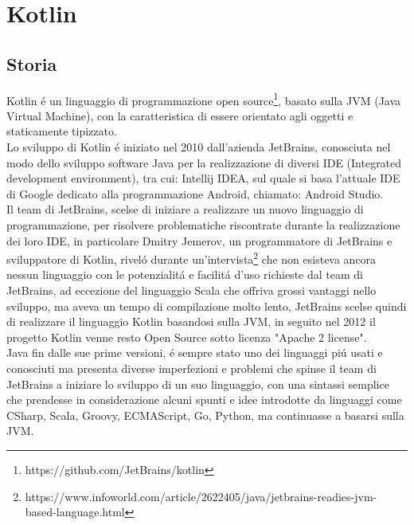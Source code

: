 \chapter{Kotlin}                %
\lhead[\fancyplain{}{\bfseries\thepage}]{\fancyplain{}{\bfseries\rightmark}}
\section{Storia}                 %

Kotlin \'e un linguaggio di programmazione open source\footnote{https://github.com/JetBrains/kotlin}, basato sulla JVM (Java Virtual Machine), con la caratteristica di essere orientato agli oggetti e staticamente tipizzato. \\
Lo sviluppo di Kotlin \'e iniziato nel 2010 dall'azienda JetBrains, conosciuta nel modo dello sviluppo software Java per la realizzazione di diversi IDE (Integrated development environment), tra cui: Intellij IDEA, sul quale si basa l'attuale IDE di Google dedicato alla programmazione Android, chiamato: Android Studio.\\
Il team di JetBrains, scelse di iniziare a realizzare un nuovo linguaggio di programmazione, per risolvere problematiche riscontrate durante la realizzazione dei loro IDE, in particolare Dmitry Jemerov, un programmatore di JetBrains e sviluppatore di Kotlin, rivel\'o durante un'intervista\footnote{https://www.infoworld.com/article/2622405/java/jetbrains-readies-jvm-based-language.html} che non esisteva ancora nessun linguaggio con le potenzialit\'a e facilit\'a d'uso richieste dal team di JetBrains, ad eccezione del linguaggio Scala che offriva grossi vantaggi nello sviluppo, ma aveva un tempo di compilazione molto lento, JetBrains scelse quindi di realizzare il linguaggio Kotlin basandosi sulla JVM, in seguito nel 2012 il progetto Kotlin venne resto Open Source sotto licenza "Apache 2 license".\\
Java fin dalle sue prime versioni, \'e sempre stato uno dei linguaggi  pi\'u usati e conosciuti ma presenta diverse imperfezioni e problemi che spinse il team di JetBrains a iniziare lo sviluppo di un suo linguaggio, con una sintassi semplice che prendesse in considerazione alcuni spunti e idee introdotte da linguaggi come CSharp, Scala, Groovy, ECMAScript, Go, Python, ma continuasse a basarsi sulla JVM.\\

